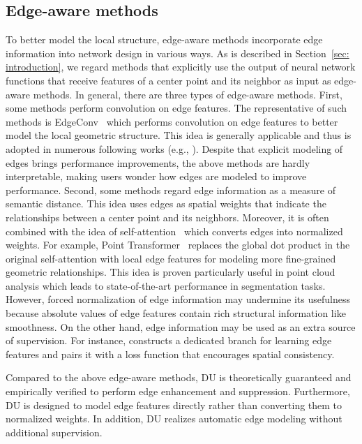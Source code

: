 \documentclass[a4paper,fleqn]{cas-dc}
\begin{document}
\subsection{Edge-aware methods} To better model the local structure, edge-aware methods incorporate edge information into network design in various ways. As is described in Section~\ref{sec: introduction}, we regard methods that explicitly use the output of neural network functions that receive features of a center point and its neighbor as input as edge-aware methods. In general, there are three types of edge-aware methods. First, some methods perform convolution on edge features. The representative of such methods is EdgeConv~\cite{wang2019dynamic} which performs convolution on edge features to better model the local geometric structure. This idea is generally applicable and thus is adopted in numerous following works (e.g., \cite{li2019deepgcns,liu2020closer,xiang2021walk}). Despite that explicit modeling of edges brings performance improvements, the above methods are hardly interpretable, making users wonder how edges are modeled to improve performance.    
Second, some methods regard edge information as a measure of semantic distance. This idea uses edges as spatial weights that indicate the relationships between a center point and its neighbors. Moreover, it is often combined with the idea of self-attention~\cite{zhao2019pointweb,zhao2021point,xiu2021enhancing,wu2022pointv2} which converts edges into normalized weights. 
For example, Point Transformer~\cite{zhao2021point} replaces the global dot product in the original self-attention with local edge features for modeling more fine-grained geometric relationships. This idea is proven particularly useful in point cloud analysis which leads to state-of-the-art performance in segmentation tasks. However, forced normalization of edge information may undermine its usefulness because absolute values of edge features contain rich structural information like smoothness.    
On the other hand, edge information may be used as an extra source of supervision. For instance, \cite{jiang2019hierarchical} constructs a dedicated branch for learning edge features and pairs it with a loss function that encourages spatial consistency.



Compared to the above edge-aware methods, DU is theoretically guaranteed and empirically verified to perform edge enhancement and suppression. Furthermore, DU is designed to model edge features directly rather than converting them to normalized weights. In addition, DU realizes automatic edge modeling without additional supervision. 
\end{document}

